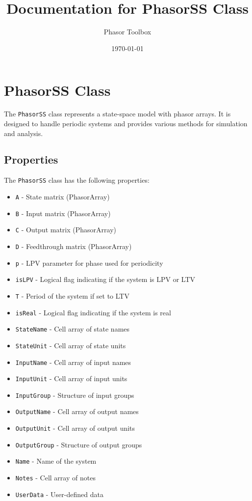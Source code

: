 \documentclass{article}
\title{Documentation for PhasorSS Class}
\author{Phasor Toolbox}
\date{\today}
\begin{document}
\maketitle

\section{PhasorSS Class}

The \texttt{PhasorSS} class represents a state-space model with phasor arrays. It is designed to handle periodic systems and provides various methods for simulation and analysis.

\subsection{Properties}

The \texttt{PhasorSS} class has the following properties:

\begin{itemize}
    \item \texttt{A} - State matrix (PhasorArray)
    \item \texttt{B} - Input matrix (PhasorArray)
    \item \texttt{C} - Output matrix (PhasorArray)
    \item \texttt{D} - Feedthrough matrix (PhasorArray)
    \item \texttt{p} - LPV parameter for phase used for periodicity
    \item \texttt{isLPV} - Logical flag indicating if the system is LPV or LTV
    \item \texttt{T} - Period of the system if set to LTV
    \item \texttt{isReal} - Logical flag indicating if the system is real
    \item \texttt{StateName} - Cell array of state names
    \item \texttt{StateUnit} - Cell array of state units
    \item \texttt{InputName} - Cell array of input names
    \item \texttt{InputUnit} - Cell array of input units
    \item \texttt{InputGroup} - Structure of input groups
    \item \texttt{OutputName} - Cell array of output names
    \item \texttt{OutputUnit} - Cell array of output units
    \item \texttt{OutputGroup} - Structure of output groups
    \item \texttt{Name} - Name of the system
    \item \texttt{Notes} - Cell array of notes
    \item \texttt{UserData} - User-defined data
\end{itemize}
\end{document}
